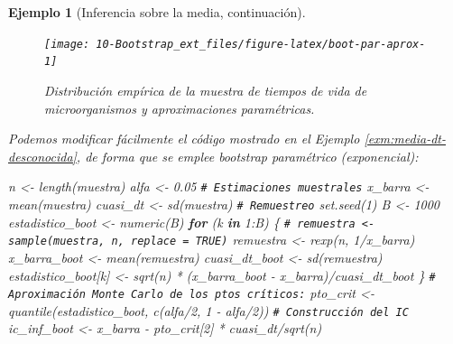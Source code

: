 \documentclass[
]{book}
\newenvironment{Shaded}{\begin{snugshade}}{\end{snugshade}}
\newcommand{\CommentTok}[1]{\textcolor[rgb]{0.56,0.35,0.01}{\textit{#1}}}
\newcommand{\ControlFlowTok}[1]{\textcolor[rgb]{0.13,0.29,0.53}{\textbf{#1}}}
\newcommand{\DecValTok}[1]{\textcolor[rgb]{0.00,0.00,0.81}{#1}}
\newcommand{\FloatTok}[1]{\textcolor[rgb]{0.00,0.00,0.81}{#1}}
\newcommand{\FunctionTok}[1]{\textcolor[rgb]{0.00,0.00,0.00}{#1}}
\newcommand{\NormalTok}[1]{#1}
\newcommand{\OtherTok}[1]{\textcolor[rgb]{0.56,0.35,0.01}{#1}}
\newcommand{\SpecialCharTok}[1]{\textcolor[rgb]{0.00,0.00,0.00}{#1}}
\theoremstyle{break}
\newtheorem{example}{Ejemplo}[chapter]
\theoremstyle{nonumberplain}
\renewcommand{\CommentTok}[1]{\textcolor[rgb]{0.41,0.41,0.41}{\texttt{#1}}}
\begin{document}
\begin{example}[Inferencia sobre la media, continuación]
\begin{figure}[!htb]

{\centering \texttt{[image: 10-Bootstrap\_ext\_files/figure-latex/boot-par-aprox-1]} 

}

\caption{Distribución empírica de la muestra de tiempos de vida de microorganismos y aproximaciones paramétricas.}\label{fig:boot-par-aprox}
\end{figure}

Podemos modificar fácilmente el código mostrado en el Ejemplo \ref{exm:media-dt-desconocida}, de forma que se emplee bootstrap paramétrico (exponencial):

\begin{Shaded}
\begin{Highlighting}[]
\NormalTok{n }\OtherTok{\textless{}{-}} \FunctionTok{length}\NormalTok{(muestra)}
\NormalTok{alfa }\OtherTok{\textless{}{-}} \FloatTok{0.05}
\CommentTok{\# Estimaciones muestrales}
\NormalTok{x\_barra }\OtherTok{\textless{}{-}} \FunctionTok{mean}\NormalTok{(muestra)}
\NormalTok{cuasi\_dt }\OtherTok{\textless{}{-}} \FunctionTok{sd}\NormalTok{(muestra)}
\CommentTok{\# Remuestreo}
\FunctionTok{set.seed}\NormalTok{(}\DecValTok{1}\NormalTok{)}
\NormalTok{B }\OtherTok{\textless{}{-}} \DecValTok{1000}
\NormalTok{estadistico\_boot }\OtherTok{\textless{}{-}} \FunctionTok{numeric}\NormalTok{(B)}
\ControlFlowTok{for}\NormalTok{ (k }\ControlFlowTok{in} \DecValTok{1}\SpecialCharTok{:}\NormalTok{B) \{}
  \CommentTok{\# remuestra \textless{}{-} sample(muestra, n, replace = TRUE)}
\NormalTok{  remuestra }\OtherTok{\textless{}{-}} \FunctionTok{rexp}\NormalTok{(n, }\DecValTok{1}\SpecialCharTok{/}\NormalTok{x\_barra)}
\NormalTok{  x\_barra\_boot }\OtherTok{\textless{}{-}} \FunctionTok{mean}\NormalTok{(remuestra)}
\NormalTok{  cuasi\_dt\_boot }\OtherTok{\textless{}{-}} \FunctionTok{sd}\NormalTok{(remuestra)}
\NormalTok{  estadistico\_boot[k] }\OtherTok{\textless{}{-}} \FunctionTok{sqrt}\NormalTok{(n) }\SpecialCharTok{*}\NormalTok{ (x\_barra\_boot }\SpecialCharTok{{-}}\NormalTok{ x\_barra)}\SpecialCharTok{/}\NormalTok{cuasi\_dt\_boot}
\NormalTok{\}}
\CommentTok{\# Aproximación Monte Carlo de los ptos críticos:}
\NormalTok{pto\_crit }\OtherTok{\textless{}{-}} \FunctionTok{quantile}\NormalTok{(estadistico\_boot, }\FunctionTok{c}\NormalTok{(alfa}\SpecialCharTok{/}\DecValTok{2}\NormalTok{, }\DecValTok{1} \SpecialCharTok{{-}}\NormalTok{ alfa}\SpecialCharTok{/}\DecValTok{2}\NormalTok{))}
\CommentTok{\# Construcción del IC}
\NormalTok{ic\_inf\_boot }\OtherTok{\textless{}{-}}\NormalTok{ x\_barra }\SpecialCharTok{{-}}\NormalTok{ pto\_crit[}\DecValTok{2}\NormalTok{] }\SpecialCharTok{*}\NormalTok{ cuasi\_dt}\SpecialCharTok{/}\FunctionTok{sqrt}\NormalTok{(n)}

\end{Highlighting}
\end{Shaded}
\end{example}
\end{document}
